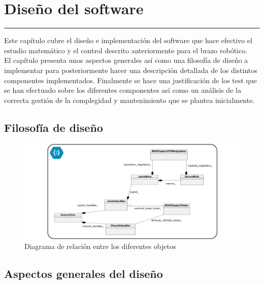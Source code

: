 \chapter{Diseño del software} \label{chap:SW}
\hrule
\vspace{3mm}

Este capítulo cubre el diseño e implementación del software que hace efectivo el estudio matemático y el control descrito anteriormente para el brazo robótico.
\\

El capítulo presenta unos aspectos generales así como una filosofía de diseño a implementar para posteriormente hacer una descripción detallada de los distintos componentes implementados. Finalmente se hace una justificación de los test que se han efectuado sobre los diferentes componentes así como un análisis de la correcta gestión de la complegidad y mantenimiento que se plantea inicialmente.

\section{Filosofía de diseño} \label{sec:SW:filosofia_diseno}


     \begin{figure}[H]
     	\centering
     	\includegraphics[width=1\textwidth]{figuras/Imagenes_SW/diagrama_clases_general.jpg}
     	\caption{Diagrama de relación entre los diferentes objetos }
     	\label{fig:SW:class_diagram_all}
     \end{figure}

\section{Aspectos generales del diseño} \label{sec:SW:diseno_general}


